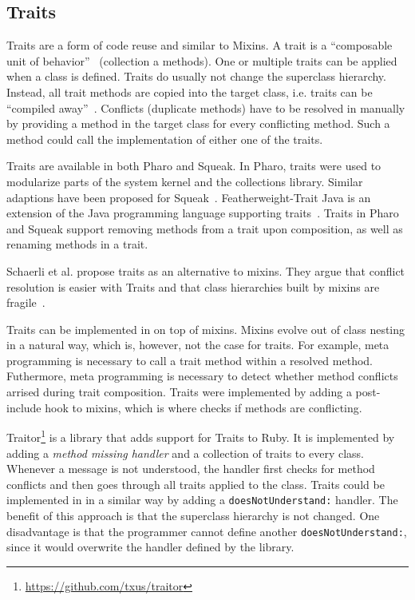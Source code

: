 
\subsection{Traits}
\label{sec:rel_traits}
Traits are a form of code reuse and similar to Mixins. A trait is a ``composable unit of behavior''~\cite{traitsschaerli} (collection a methods). One or multiple traits can be applied when a class is defined. Traits do usually not change the superclass hierarchy. Instead, all trait methods are copied into the target class, i.e. traits can be ``compiled away''~\cite{Nierstrasz06flatteningtraits}. Conflicts (duplicate methods) have to be resolved in manually by providing a method in the target class for every conflicting method. Such a method could call the implementation of either one of the traits.

Traits are available in both Pharo and Squeak. In Pharo, traits were used to modularize parts of the system kernel and the collections library. Similar adaptions have been proposed for Squeak~\cite{PHDschaerli}. Featherweight-Trait Java is an extension of the Java programming language supporting traits~\cite{Nierstrasz06flatteningtraits}. Traits in Pharo and Squeak support removing methods from a trait upon composition, as well as renaming methods in a trait.

Schaerli et al. propose traits as an alternative to mixins. They argue that conflict resolution is easier with Traits and that class hierarchies built by mixins are fragile~\cite{Schaerli_classes_is}.

Traits can be implemented in \msname on top of mixins. Mixins evolve out of class nesting in a natural way, which is, however, not the case for traits. For example, meta programming is necessary to call a trait method within a resolved method. Futhermore, meta programming is necessary to detect whether method conflicts arrised during trait composition. Traits were implemented by adding a post-include hook to mixins, which is where \msname checks if methods are conflicting. 

Traitor\footnote{\url{https://github.com/txus/traitor}} is a library that adds support for Traits to Ruby. It is implemented by adding a \emph{method missing handler} and a collection of traits to every class. Whenever a message is not understood, the handler first checks for method conflicts and then goes through all traits applied to the class. Traits could be implemented in \msname in a similar way by adding a \texttt{doesNotUnderstand:} handler. The benefit of this approach is that the superclass hierarchy is not changed. One disadvantage is that the programmer cannot define another \texttt{doesNotUnderstand:}, since it would overwrite the handler defined by the library.

